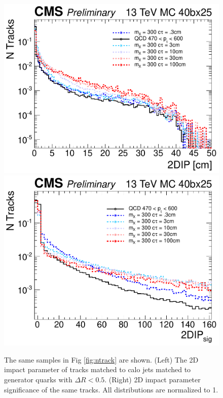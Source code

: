\begin{figure}
\begin{center}
\includegraphics[width=.45\textwidth]{figures/an_jetid/VTX_MATCH_IP/liTrackIP2D}
\includegraphics[width=.45\textwidth]{figures/an_jetid/VTX_MATCH_IP/liTrackIPSig2D}\\
\end{center}
\caption{The same samples in Fig \ref{fig:ntrack} are shown. (Left) The 2D impact parameter of tracks matched to calo jets matched to 
generator quarks with $\Delta R < 0.5$. (Right) 2D impact parameter significance of the same tracks. All distributions are normalized to 1.}
\label{fig:iptrack}
\end{figure}

